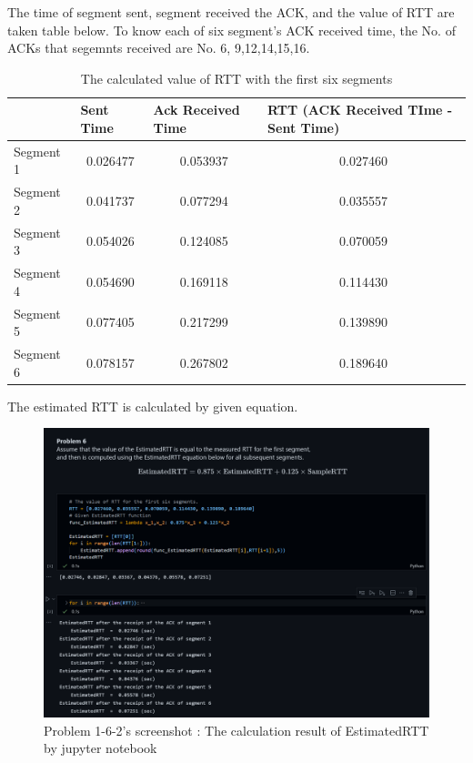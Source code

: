 \begin{enumerate}[label=\bfseries Problem \arabic*:,leftmargin=*,labelindent=1em]
        The time of segment sent, segment received the ACK, and the value of RTT are taken table below. To know each of six segment’s ACK received time, the No. of  ACKs that segemnts received are  No. 6, 9,12,14,15,16.
        \begin{table}[!h]\centering
        \hspace{10mm}
        \begin{tabular}{|l|c|c|c|}
        \hline
         & \multicolumn{1}{l|}{Sent Time} & \multicolumn{1}{l|}{Ack Received Time} & \multicolumn{1}{l|}{RTT (ACK Received TIme - Sent Time)} \\ \hline
        Segment 1 & 0.026477 & 0.053937 & 0.027460 \\ \hline
        Segment 2 & 0.041737 & 0.077294 & 0.035557 \\ \hline
        Segment 3 & 0.054026 & 0.124085 & 0.070059 \\ \hline
        Segment 4 & 0.054690 & 0.169118 & 0.114430 \\ \hline
        Segment 5 & 0.077405 & 0.217299 & 0.139890 \\ \hline
        Segment 6 & 0.078157 & 0.267802 & 0.189640 \\ \hline
        \end{tabular}
        \caption{The calculated value of RTT with the first six segments}
        \end{table}
\clearpage
        The estimated RTT is calculated by given equation.\\
        \vspace{-4mm}  
        \begin{figure}[!h]\raggedleft
        \hspace{15mm}
    		\includegraphics[width=.95\textwidth]{image/week02/1-6-3.png}
    		\caption{\footnotesize Problem 1-6-2's screenshot : The calculation result of EstimatedRTT by jupyter notebook}
    		\vspace{-10pt}
        \end{figure}
        

\end{enumerate}
